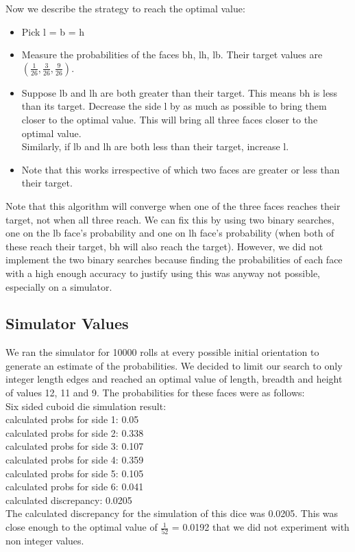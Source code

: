 Now we describe the strategy to reach the optimal value:\\
\begin{itemize}
    \item Pick l = b = h\\
    \item Measure the probabilities of the faces bh, lh, lb. Their target values are $(\frac{1}{26}, \frac{3}{26}, \frac{9}{26})$.\\
    \item Suppose lb and lh are both greater than their target. This means bh is less than its target. Decrease the side l by as much as possible to bring them closer to the optimal value. This will bring all three faces closer to the optimal value.\\
    Similarly, if lb and lh are both less than their target, increase l.\\
    \item Note that this works irrespective of which two faces are greater or less than their target.\\
    
\end{itemize}

Note that this algorithm will converge when one of the three faces reaches their target, not when all three reach. We can fix this by using two binary searches, one on the lb face's probability and one on lh face's probability (when both of these reach their target, bh will also reach the target). However, we did not implement the two binary searches because finding the probabilities of each face with a high enough accuracy to justify using this was anyway not possible, especially on a simulator.\\

\subsection{Simulator Values}
We ran the simulator for 10000 rolls at every possible initial orientation to generate an estimate of the probabilities. We decided to limit our search to only integer length edges and reached an optimal value of length, breadth and height of values 12, 11 and 9. The probabilities for these faces were as follows:\\
Six sided cuboid die simulation result:\\
calculated probs for side 1: 0.05 \\
calculated probs for side 2: 0.338 \\
calculated probs for side 3: 0.107 \\
calculated probs for side 4: 0.359 \\
calculated probs for side 5: 0.105 \\
calculated probs for side 6: 0.041\\
calculated discrepancy: 0.0205\\
The calculated discrepancy for the simulation of this dice was 0.0205. This was close enough to the optimal value of $\frac{1}{52}$ = 0.0192 that we did not experiment with non integer values.\\
